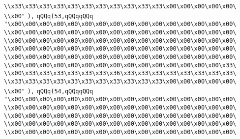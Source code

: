 \verb|\\x33\x33\x33\x33\x33\x33\x33\x33\x33\x33\x33\x00\x00\x00\x00\x00\|\newline
\verb|\\x00"|\newline
\verb|),|\newline
\verb|qQQq(53,qQQqqQQq|\newline
\verb|"\x00\x00\x00\x00\x00\x00\x00\x00\x00\x00\x00\x00\x00\x00\x00\x00\|\newline
\verb|\\x00\x00\x00\x00\x00\x00\x00\x00\x00\x00\x00\x00\x00\x00\x00\x00\|\newline
\verb|\\x00\x00\x00\x00\x00\x00\x00\x00\x00\x00\x00\x00\x00\x00\x00\x00\|\newline
\verb|\\x00\x00\x00\x00\x00\x00\x00\x00\x00\x00\x00\x00\x00\x00\x00\x00\|\newline
\verb|\\x00\x00\x00\x00\x00\x00\x00\x00\x00\x00\x00\x00\x00\x00\x00\x00\|\newline
\verb|\\x00\x00\x00\x00\x00\x00\x00\x00\x00\x00\x00\x00\x00\x00\x00\x33\|\newline
\verb|\\x00\x33\x33\x33\x33\x33\x33\x36\x33\x33\x33\x33\x33\x33\x33\x33\|\newline
\verb|\\x33\x33\x33\x33\x33\x33\x33\x33\x33\x33\x33\x00\x00\x00\x00\x00\|\newline
\verb|\\x00"|\newline
\verb|),|\newline
\verb|qQQq(54,qQQqqQQq|\newline
\verb|"\x00\x00\x00\x00\x00\x00\x00\x00\x00\x00\x00\x00\x00\x00\x00\x00\|\newline
\verb|\\x00\x00\x00\x00\x00\x00\x00\x00\x00\x00\x00\x00\x00\x00\x00\x00\|\newline
\verb|\\x00\x00\x00\x00\x00\x00\x00\x00\x00\x00\x00\x00\x00\x00\x00\x00\|\newline
\verb|\\x00\x00\x00\x00\x00\x00\x00\x00\x00\x00\x00\x00\x00\x00\x00\x00\|\newline
\verb|\\x00\x00\x00\x00\x00\x00\x00\x00\x00\x00\x00\x00\x00\x00\x00\x00\|\newline
